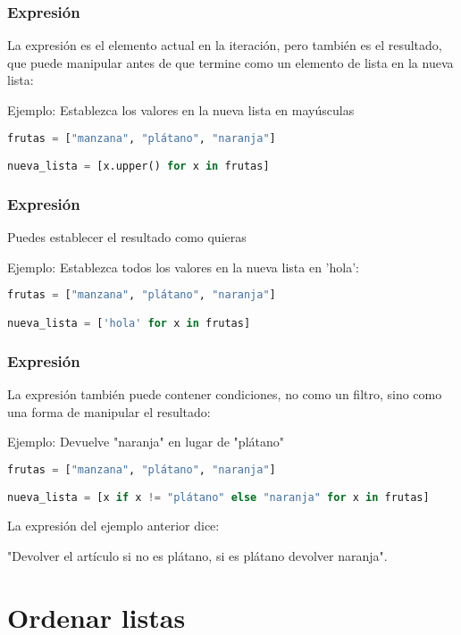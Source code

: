 \begin{frame}[fragile]
  \frametitle{Expresión}

  La expresión es el elemento actual en la iteración,
  pero también es el resultado, que puede manipular antes de que
  termine como un elemento de lista en la nueva lista:

  \vspace{\baselineskip}
  Ejemplo: Establezca los valores en la nueva lista en mayúsculas
  \begin{lstlisting}[language=Python]
frutas = ["manzana", "plátano", "naranja"]

nueva_lista = [x.upper() for x in frutas]
  \end{lstlisting}
\end{frame}

\begin{frame}[fragile]
  \frametitle{Expresión}

  Puedes establecer el resultado como quieras

  \vspace{\baselineskip}
  Ejemplo: Establezca todos los valores en la nueva lista en 'hola':
  \begin{lstlisting}[language=Python]
frutas = ["manzana", "plátano", "naranja"]

nueva_lista = ['hola' for x in frutas]
  \end{lstlisting}
\end{frame}

\begin{frame}[fragile]
  \frametitle{Expresión}

  La expresión también puede contener condiciones,
  no como un filtro, sino como una forma de manipular el resultado:

  \vspace{\baselineskip}
  Ejemplo: Devuelve "naranja" en lugar de "plátano"
  \begin{lstlisting}[language=Python]
frutas = ["manzana", "plátano", "naranja"]

nueva_lista = [x if x != "plátano" else "naranja" for x in frutas]
  \end{lstlisting}

  La expresión del ejemplo anterior dice:

  \vspace{\baselineskip}
  "Devolver el artículo si no es plátano, si es plátano devolver naranja".
\end{frame}


\section{Ordenar listas}


